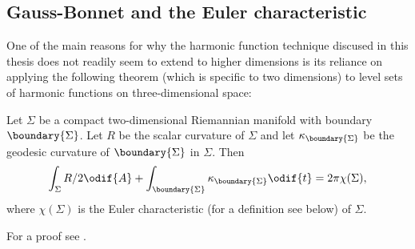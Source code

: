 \documentclass[titlepage,numbers=noenddot,oneside,%
cleardoublepage=empty,paper=a4,fontsize=11pt,%
english,%
]{scrartcl}
\begin{document}
\subsection{Gauss-Bonnet and the Euler characteristic}
One of the main reasons for why the harmonic function technique discused in this thesis does not readily seem to extend to higher dimensions is its reliance on applying the following theorem (which is specific to two dimensions) to level sets of harmonic functions on three-dimensional space:
\begin{theorem}\label{thm:gauss_bonnet}
    Let \( \Sigma \) be a compact two-dimensional Riemannian manifold with boundary \( \boundary{\Sigma} \). Let \( R \) be the scalar curvature of \( \Sigma \) and let \( \kappa_{\boundary{\Sigma}} \) be the geodesic curvature of \( \boundary{\Sigma} \) in \( \Sigma \). Then
   \begin{equation*}
    \int_\Sigma R/2 \odif{A}+\int_{\boundary{\Sigma}}\kappa_{\boundary{\Sigma}}\odif{t}=2\pi \chi(\Sigma),
   \end{equation*} 
   where \( \chi(\Sigma) \) is the Euler characteristic (for a definition see below) of \( \Sigma \).
\end{theorem}
For a proof see \cite[Chapter 4.3]{petersenRiemannianGeometry2006}. 
\end{document}
